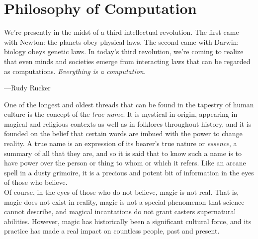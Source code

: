 \part*{Philosophy of Computation}

\vspace{4mm}
\begin{displayquote}
    We're presently in the midst of a third intellectual revolution. The first came with Newton: the planets obey physical laws. The second came with Darwin: biology obeys genetic laws. In today’s third revolution, we're coming to realize that even minds and societies emerge from interacting laws that can be regarded as computations. \textit{Everything is a computation.}
	\vspace{2mm}
	\begin{flushright}
		---Rudy Rucker
	\end{flushright}
\end{displayquote}
\vspace{4mm}


One of the longest and oldest threads that can be found in the tapestry of human culture is the concept of the \textit{true name}. It is mystical in origin, appearing in magical and religious contexts as well as in folklores throughout history, and it is founded on the belief that certain words are imbued with the power to change reality. A true name is an expression of its bearer's true nature or \textit{essence}, a summary of all that they are, and so it is said that to know such a name is to have power over the person or thing to whom or which it refers. Like an arcane spell in a dusty grimoire, it is a precious and potent bit of information in the eyes of those who believe. \\

Of course, in the eyes of those who do not believe, magic is not real. That is, magic does not exist in reality, magic is not a special phenomenon that science cannot describe, and magical incantations do not grant casters supernatural abilities. However, magic has historically been a significant cultural force, and its practice has made a real impact on countless people, past and present.



